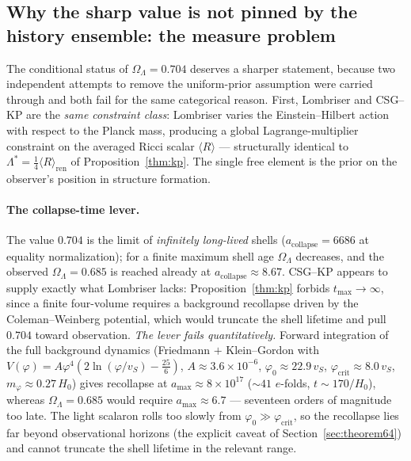 \documentclass[11pt,a4paper]{article}
\theoremstyle{plain}
\theoremstyle{definition}
\theoremstyle{remark}
\newcommand{\OL}{\Omega_\Lambda}
\newcommand{\avg}[1]{\langle #1 \rangle}
\begin{document}
\subsection{Why the sharp value is not pinned by the history ensemble: the measure problem}
\label{sec:measure}
The conditional status of $\OL = 0.704$ deserves a sharper statement, because two independent
attempts to remove the uniform-prior assumption were carried through and both fail for the same
categorical reason. First, Lombriser and CSG--KP are the \emph{same constraint class}: Lombriser
varies the Einstein--Hilbert action with respect to the Planck mass, producing a global
Lagrange-multiplier constraint on the averaged Ricci scalar $\avg{R}$ --- structurally identical
to $\Lambda^* = \tfrac14\avg{R}_{\mathrm{ren}}$ of Proposition~\ref{thm:kp}. The single free element
is the prior on the observer's position in structure formation.

\paragraph{The collapse-time lever.} The value $0.704$ is the limit of \emph{infinitely
long-lived} shells ($a_{\mathrm{collapse}} = 6686$ at equality normalization); for a finite
maximum shell age $\OL$ decreases, and the observed $\OL = 0.685$ is reached already at
$a_{\mathrm{collapse}} \approx 8.67$. CSG--KP appears to supply exactly what Lombriser lacks:
Proposition~\ref{thm:kp} forbids $t_{\max}\to\infty$, since a finite four-volume requires a background
recollapse driven by the Coleman--Weinberg potential, which would truncate the shell lifetime and
pull $0.704$ toward observation. \emph{The lever fails quantitatively.} Forward integration of the
full background dynamics (Friedmann $+$ Klein--Gordon with
$V(\varphi) = A\varphi^4(2\ln(\varphi/v_S) - \tfrac{25}{6})$, $A \approx 3.6\times 10^{-6}$,
$\varphi_0 \approx 22.9\,v_S$, $\varphi_{\mathrm{crit}} \approx 8.0\,v_S$,
$m_\varphi \approx 0.27\,H_0$) gives recollapse at $a_{\max} \approx 8\times 10^{17}$
($\sim 41$ $e$-folds, $t \sim 170/H_0$), whereas $\OL = 0.685$ would require
$a_{\max} \approx 6.7$ --- seventeen orders of magnitude too late. The light scalaron rolls too
slowly from $\varphi_0 \gg \varphi_{\mathrm{crit}}$, so the recollapse lies far beyond
observational horizons (the explicit caveat of Section~\ref{sec:theorem64}) and cannot truncate
the shell lifetime in the relevant range.
\end{document}

